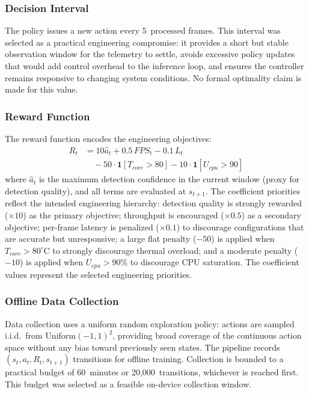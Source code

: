 \documentclass{ieeeaccess}
\begin{document}
\subsubsection*{Decision Interval}

The policy issues a new action every 5~processed frames. This interval was
selected as a practical engineering compromise: it provides a short but
stable observation window for the telemetry to settle, avoids excessive
policy updates that would add control overhead to the inference loop, and
ensures the controller remains responsive to changing system conditions.
No formal optimality claim is made for this value.

\subsubsection*{Reward Function}

The reward function encodes the engineering objectives:
\begin{equation}
\begin{split}
R_t &= 10\hat{a}_t + 0.5\,FPS_t - 0.1\,L_t \\
    &\quad - 50\cdot\mathbf{1}[T_{core}>80] - 10\cdot\mathbf{1}[U_{cpu}>90]
\end{split}
\end{equation}
where $\hat{a}_t$ is the maximum detection confidence in the current window
(proxy for detection quality), and all terms are evaluated at $s_{t+1}$.
The coefficient priorities reflect the intended engineering hierarchy:
detection quality is strongly rewarded ($\times 10$) as the primary objective;
throughput is encouraged ($\times 0.5$) as a secondary objective; per-frame
latency is penalized ($\times 0.1$) to discourage configurations that are
accurate but unresponsive; a large flat penalty ($-50$) is applied when
$T_{core} > 80^\circ$C to strongly discourage thermal overload; and a
moderate penalty ($-10$) is applied when $U_{cpu} > 90\%$ to discourage
CPU saturation. The coefficient values represent the selected engineering
priorities.

\subsubsection*{Offline Data Collection}

Data collection uses a uniform random exploration policy: actions are
sampled i.i.d.\ from $\mathrm{Uniform}(-1,1)^2$, providing broad coverage
of the continuous action space without any bias toward previously seen
states. The pipeline records $(s_t, a_t, R_t, s_{t+1})$ transitions for
offline training. Collection is bounded to a practical budget of 60~minutes
or 20,000~transitions, whichever is reached first. This budget was selected
as a feasible on-device collection window.
\end{document}
